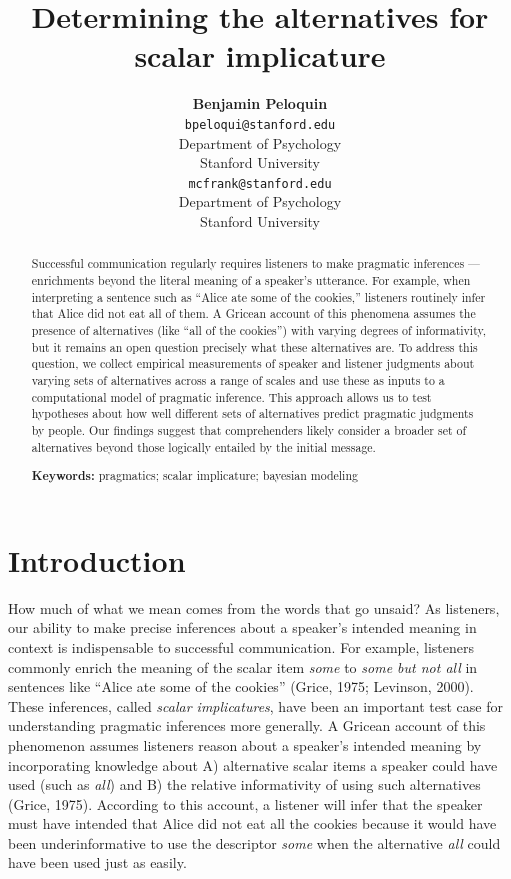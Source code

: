 \documentclass[10pt, letterpaper]{article}
\title{Determining the alternatives for scalar implicature}
\author{{\large \bf Benjamin Peloquin} \\ \texttt{bpeloqui@stanford.edu} \\ Department of Psychology \\ Stanford University \And {\large \bf Michael C. Frank} \\ \texttt{mcfrank@stanford.edu} \\ Department of Psychology \\ Stanford University}
\begin{document}
\maketitle

\begin{abstract}
Successful communication regularly requires listeners to make pragmatic
inferences --- enrichments beyond the literal meaning of a speaker's
utterance. For example, when interpreting a sentence such as ``Alice ate
some of the cookies,'' listeners routinely infer that Alice did not eat
all of them. A Gricean account of this phenomena assumes the presence of
alternatives (like ``all of the cookies'') with varying degrees of
informativity, but it remains an open question precisely what these
alternatives are. To address this question, we collect empirical
measurements of speaker and listener judgments about varying sets of
alternatives across a range of scales and use these as inputs to a
computational model of pragmatic inference. This approach allows us to
test hypotheses about how well different sets of alternatives predict
pragmatic judgments by people. Our findings suggest that comprehenders
likely consider a broader set of alternatives beyond those logically
entailed by the initial message.

\textbf{Keywords:}
pragmatics; scalar implicature; bayesian modeling
\end{abstract}

\section{Introduction}\label{introduction}

How much of what we mean comes from the words that go unsaid? As
listeners, our ability to make precise inferences about a speaker's
intended meaning in context is indispensable to successful
communication. For example, listeners commonly enrich the meaning of the
scalar item \emph{some} to \emph{some but not all} in sentences like
``Alice ate some of the cookies'' (Grice, 1975; Levinson, 2000). These
inferences, called \emph{scalar implicatures}, have been an important
test case for understanding pragmatic inferences more generally. A
Gricean account of this phenomenon assumes listeners reason about a
speaker's intended meaning by incorporating knowledge about A)
alternative scalar items a speaker could have used (such as \emph{all})
and B) the relative informativity of using such alternatives (Grice,
1975). According to this account, a listener will infer that the speaker
must have intended that Alice did not eat all the cookies because it
would have been underinformative to use the descriptor \emph{some} when
the alternative \emph{all} could have been used just as easily.
\end{document}
